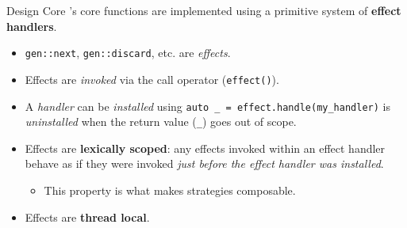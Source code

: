 \begin{frame}{\halcheck{} \textemdash{} Design \textemdash{} Core}
  \halcheck{}'s core functions are implemented using a primitive system of \textbf{effect handlers}.

  \begin{itemize}
    \item<+-> \texttt{gen::next}, \texttt{gen::discard}, etc. are \emph{effects}.
    \item<+-> Effects are \emph{invoked} via the call operator (\texttt{effect()}).
    \item<+-> A \emph{handler} can be \emph{installed} using \texttt{auto _ = effect.handle(my_handler)} is \emph{uninstalled} when the return value (\texttt{_}) goes out of scope.
    \item<+-> Effects are \textbf{lexically scoped}: any effects invoked within an effect handler behave as if they were invoked \emph{just before the effect handler was installed}.
    \begin{itemize}
      \item This property is what makes strategies composable.
    \end{itemize}
    \item<+-> Effects are \textbf{thread local}.
  \end{itemize}
\end{frame}

